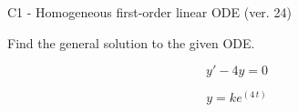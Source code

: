\begin{exercise}
  \begin{exerciseTitle}C1 - Homogeneous first-order linear ODE (ver. 24)\end{exerciseTitle}
  \begin{exerciseStatement}
    
Find the general solution to the given ODE.

    
\[y'-4y=0\]

  \end{exerciseStatement}
  \begin{exerciseAnswer}
    
\[y= k e^{\left(4 \, t\right)}\]

  \end{exerciseAnswer}
\end{exercise}